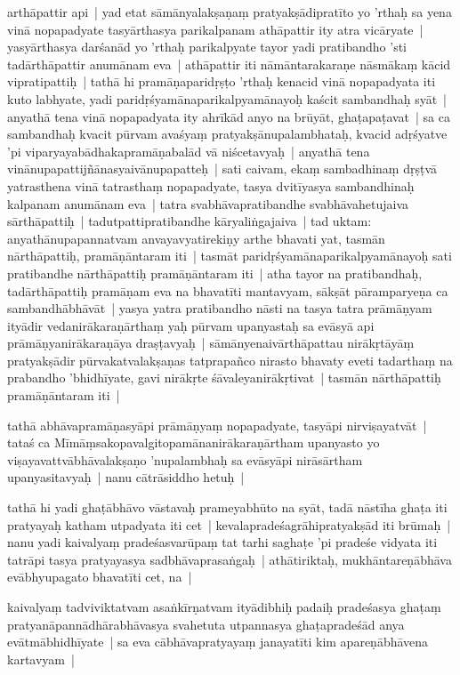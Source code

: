 \documentclass[article,12pt,a4paper]{memoir}
\begin{document}
	  \pstart arthāpattir api | yad etat sāmānyalakṣaṇaṃ pratyakṣādipratīto yo 'rthaḥ sa yena vinā nopapadyate tasyārthasya parikalpanam athāpattir ity atra vicāryate | yasyārthasya darśanād yo 'rthaḥ parikalpyate tayor yadi pratibandho 'sti tadārthāpattir anumānam eva | athāpattir iti nāmāntarakaraṇe nāsmākaṃ kācid vipratipattiḥ | tathā hi pramāṇaparidṛṣṭo 'rthaḥ kenacid vinā nopapadyata iti kuto labhyate, yadi paridṛśyamānaparikalpyamānayoḥ kaścit sambandhaḥ syāt | anyathā tena vinā nopapadyata ity ahrīkād anyo na brūyāt, ghaṭapaṭavat | sa ca sambandhaḥ kvacit pūrvam avaśyaṃ pratyakṣānupalambhataḥ, kvacid adṛśyatve 'pi viparyayabādhakapramāṇabalād vā niścetavyaḥ | anyathā tena vinānupapattijñānasyaivānupapatteḥ | sati caivam, ekaṃ sambadhinaṃ dṛṣṭvā yatrasthena vinā tatrasthaṃ nopapadyate, tasya dvitīyasya sambandhinaḥ kalpanam anumānam eva | tatra svabhāvapratibandhe svabhāvahetujaiva sārthāpattiḥ | tadutpattipratibandhe kāryaliṅgajaiva | tad uktam: anyathānupapannatvam anvayavyatirekiṇy arthe bhavati yat, tasmān nārthāpattiḥ, pramāṇāntaram iti | tasmāt paridṛśyamānaparikalpyamānayoḥ sati pratibandhe nārthāpattiḥ pramāṇāntaram iti | atha tayor na pratibandhaḥ, tadārthāpattiḥ pramāṇam eva na bhavatīti mantavyam, sākṣāt pāramparyeṇa ca sambandhābhāvāt | yasya yatra pratibandho nāsti na tasya tatra prāmāṇyam ityādir vedanirākaraṇārthaṃ yaḥ pūrvam upanyastaḥ sa evāsyā api prāmāṇyanirākaraṇāya draṣṭavyaḥ | sāmānyenaivārthāpattau nirākṛtāyāṃ pratyakṣādir pūrvakatvalakṣaṇas tatprapañco nirasto bhavaty eveti tadarthaṃ na prabandho 'bhidhīyate, gavi nirākṛte śāvaleyanirākṛtivat | tasmān nārthāpattiḥ pramāṇāntaram iti | 
	\pend
      

	  \pstart tathā abhāvapramāṇasyāpi prāmāṇyaṃ nopapadyate, tasyāpi nirviṣayatvāt | tataś ca Mīmāṃsakopavalgitopamānanirākaraṇārtham upanyasto yo viṣayavattvābhāvalakṣaṇo 'nupalambhaḥ sa evāsyāpi nirāsārtham upanyasitavyaḥ | nanu cātrāsiddho hetuḥ |
	\pend
      

	  \pstart tathā hi yadi ghaṭābhāvo vāstavaḥ prameyabhūto na syāt, tadā nāstīha ghaṭa iti pratyayaḥ katham utpadyata iti cet | kevalapradeśagrāhipratyakṣād iti brūmaḥ | nanu yadi kaivalyaṃ pradeśasvarūpaṃ tat tarhi saghaṭe 'pi pradeśe vidyata iti tatrāpi tasya pratyayasya sadbhāvaprasaṅgaḥ | athātiriktaḥ, mukhāntareṇābhāva evābhyupagato bhavatīti cet, na |
	\pend
      

	  \pstart kaivalyaṃ tadviviktatvam asaṅkīrṇatvam ityādibhiḥ padaiḥ pradeśasya ghaṭaṃ pratyanāpannādhārabhāvasya svahetuta utpannasya ghaṭapradeśād anya evātmābhidhīyate | sa eva cābhāvapratyayaṃ janayatīti kim apareṇābhāvena kartavyam |
	\pend
      
\end{document}
